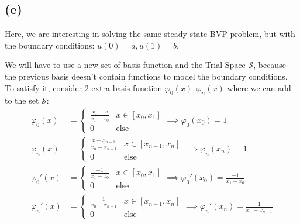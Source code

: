 \documentclass[]{article}
\begin{document}
    \subsection*{(e)}
        \hspace{1.1em}
        Here, we are interesting in solving the same steady state BVP problem, but with the boundary conditions: $u(0) = a, u(1) = b$. 
        \par
        We will have to use a new set of basis function and the Trial Space $\mathcal{S}$, because the previous basis deesn't contain functions to model the boundary conditions. To satisfy it, consider 2 extra basis function $\varphi_0(x), \varphi_{n}(x)$ where we can add to the set $\mathcal{S}$: 
        \begin{align*}\tag{1.e.1}\label{eqn:1.e.1}
            \varphi_0(x) &= 
            \begin{cases}
                \frac{x_1 - x}{x_1 - x_0}
                & 
                x \in [x_0, x_1]
                \\
                0 & \text{else}
            \end{cases}
            \implies 
            \varphi_0(x_0) = 1
            \\
            \varphi_{n}(x) &= 
            \begin{cases}
                \frac{x - x_{n - 1}}{x_n - x_{n - 1}}
                & 
                x\in [x_{n - 1}, x_n]
                \\
                0 & \text{else}
            \end{cases}
            \implies 
            \varphi_n(x_n) = 1
            \\
            \varphi_0'(x) &= \begin{cases}
                \frac{-1}{x_1 - x_0} & x\in [x_0, x_1]
                \\
                0 & \text{else}
            \end{cases}
            \implies \varphi_0'(x_0) = \frac{-1}{x_1 - x_0}
            \\
            \varphi_n'(x) &= 
            \begin{cases}
                \frac{1}{x_n - x_{n - 1}} & x\in [x_{n - 1}, x_n]
                \\
                0 & \text{else}
            \end{cases}
            \implies \varphi_n'(x_n) = \frac{1}{x_n - x_{n - 1}}
        \end{align*}
        \par
\end{document}
